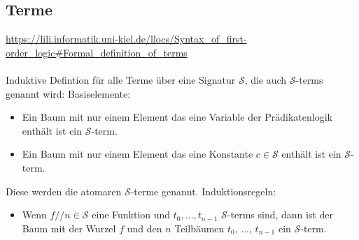 \documentclass[twocolumn]{article}
\begin{document}
    \subsection{Terme}
    \url{https://lili.informatik.uni-kiel.de/llocs/Syntax_of_first-order_logic#Formal_definition_of_terms}\\\\
    Induktive Defintion für alle Terme über eine Signatur $\mathcal{S}$, die auch $\mathcal{S}$-terms genannt wird:
    Basiselemente:\\
    \begin{itemize}
        \item Ein Baum mit nur einem Element das eine Variable der Prädikatenlogik enthält ist ein $\mathcal{S}$-term.
        \item Ein Baum mit nur einem Element das eine Konstante $c \in \mathcal{S}$ enthält ist ein $\mathcal{S}$-term.
    \end{itemize}
    Diese werden die atomaren $\mathcal{S}$-terme genannt.
    Induktionsregeln:\\
    \begin{itemize}
        \item Wenn  $f/\!/n \in \mathcal S$ eine Funktion und $t_0, \dots, t_{n-1}$ $\mathcal S$-terms sind, dann ist der Baum mit der Wurzel $f$ und den $n$ Teilbäumen $t_0$, ..., $t_{n-1}$ ein $\mathcal S$-term.
    \end{itemize}
\end{document}
